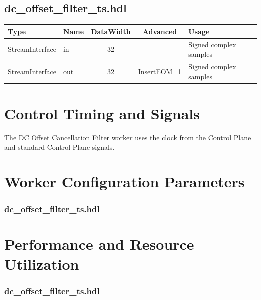 \documentclass{article}
\def\comp{dc\_offset\_filter\_ts}
\edef\ecomp{dc_offset_filter_ts}
\begin{document}
\begin{landscape}
\subsection*{\comp.hdl}
\begin{scriptsize}
	\begin{tabular}{|M{2cm}|M{1.5cm}|c|c|M{10cm}|}
		\hline
		Type            & Name & DataWidth & Advanced                & Usage                  \\
		\hline
		StreamInterface & in   & 32        & & Signed complex samples \\
		\hline
		StreamInterface & out  & 32        & InsertEOM=1 & Signed complex samples \\
		\hline
	\end{tabular}
\end{scriptsize}
\end{landscape}

\section*{Control Timing and Signals}
\begin{flushleft}
The DC Offset Cancellation Filter worker uses the clock from the Control Plane and standard Control Plane signals.
\end{flushleft}

\begin{landscape}
\section*{Worker Configuration Parameters}
\subsubsection*{\comp.hdl}

\section*{Performance and Resource Utilization}
\subsubsection*{\comp.hdl}

\end{landscape}
\end{document}
